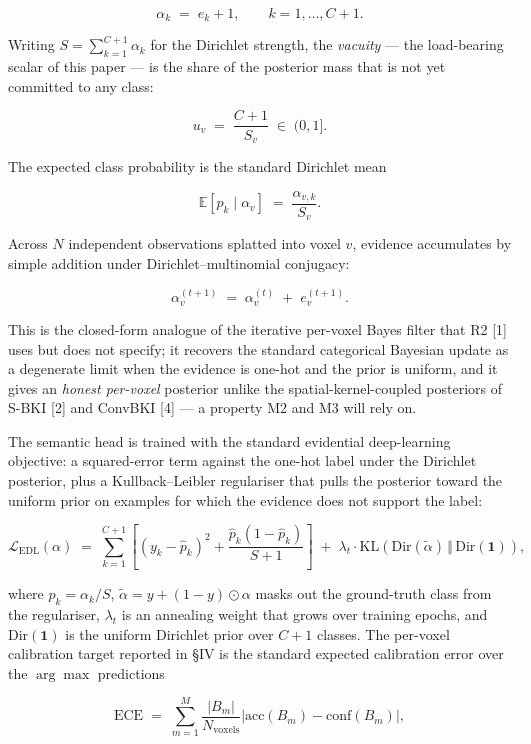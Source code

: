 \documentclass[
]{article}
\begin{document}
\[
\alpha_k \;=\; e_k + 1, \qquad k = 1, \ldots, C+1 . \tag{1}
\]

Writing \(S = \sum_{k=1}^{C+1} \alpha_k\) for the Dirichlet strength,
the \emph{vacuity} --- the load-bearing scalar of this paper --- is the
share of the posterior mass that is not yet committed to any class:

\[
u_v \;=\; \frac{C+1}{S_v} \;\in\; (0, 1] . \tag{2}
\]

The expected class probability is the standard Dirichlet mean

\[
\mathbb{E}[p_k \mid \alpha_v] \;=\; \frac{\alpha_{v,k}}{S_v} . \tag{3}
\]

Across \(N\) independent observations splatted into voxel \(v\),
evidence accumulates by simple addition under Dirichlet--multinomial
conjugacy:

\[
\alpha_v^{(t+1)} \;=\; \alpha_v^{(t)} \;+\; e_v^{(t+1)} . \tag{4}
\]

This is the closed-form analogue of the iterative per-voxel Bayes filter
that R2 {[}1{]} uses but does not specify; it recovers the standard
categorical Bayesian update as a degenerate limit when the evidence is
one-hot and the prior is uniform, and it gives an \emph{honest
per-voxel} posterior unlike the spatial-kernel-coupled posteriors of
S-BKI {[}2{]} and ConvBKI {[}4{]} --- a property M2 and M3 will rely on.

The semantic head is trained with the standard evidential deep-learning
objective: a squared-error term against the one-hot label under the
Dirichlet posterior, plus a Kullback--Leibler regulariser that pulls the
posterior toward the uniform prior on examples for which the evidence
does not support the label:

\[
\mathcal{L}_{\text{EDL}}(\alpha)
\;=\;
\sum_{k=1}^{C+1}
\left[
(y_k - \hat{p}_k)^2 + \frac{\hat{p}_k(1-\hat{p}_k)}{S+1}
\right]
\;+\;
\lambda_t \cdot \mathrm{KL}\!\left(
\mathrm{Dir}(\tilde\alpha) \,\Vert\, \mathrm{Dir}(\mathbf{1})
\right) , \tag{5}
\]

where \(\hat{p}_k = \alpha_k / S\),
\(\tilde\alpha = y + (1 - y) \odot \alpha\) masks out the ground-truth
class from the regulariser, \(\lambda_t\) is an annealing weight that
grows over training epochs, and \(\mathrm{Dir}(\mathbf{1})\) is the
uniform Dirichlet prior over \(C+1\) classes. The per-voxel calibration
target reported in §IV is the standard expected calibration error over
the \(\arg\max\) predictions

\[
\mathrm{ECE}
\;=\;
\sum_{m=1}^{M}
\frac{|B_m|}{N_{\text{voxels}}}
\left| \mathrm{acc}(B_m) - \mathrm{conf}(B_m) \right| , \tag{6}
\]
\end{document}
